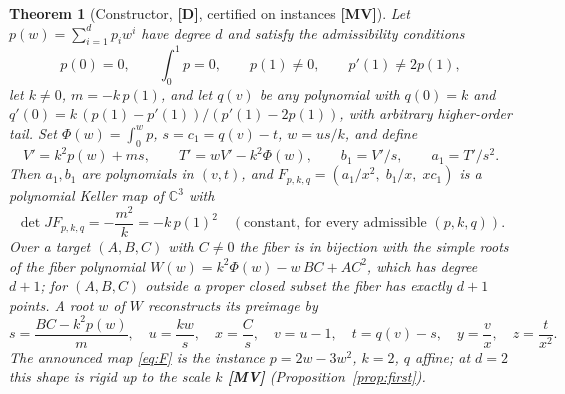 \documentclass[11pt]{article}
\newtheorem{theorem}{Theorem}[section]
\theoremstyle{definition}
\theoremstyle{remark}
\newcommand{\C}{\mathbb{C}}
\newcommand{\MV}{\textbf{[MV]}}
\newcommand{\DD}{\textbf{[D]}}
\begin{document}
\begin{theorem}[Constructor, {\DD}, certified on instances {\MV}]\label{thm:family}
Let $p(w) = \sum_{i=1}^{d} p_i w^i$ have degree $d$ and satisfy the admissibility conditions
\begin{equation}\label{eq:adm}
p(0) = 0, \qquad \int_0^1 p = 0, \qquad p(1) \ne 0, \qquad p'(1) \ne 2 p(1),
\end{equation}
let $k \ne 0$, $m = -k\,p(1)$, and let $q(v)$ be any polynomial with $q(0) = k$ and
$q'(0) = k\,(p(1) - p'(1))/(p'(1) - 2p(1))$, with arbitrary higher-order tail. Set
$\Phi(w) = \int_0^w p$, $s = c_1 = q(v) - t$, $w = u s / k$, and define
\begin{equation}\label{eq:potential}
V' = k^2 p(w) + m s, \qquad T' = w V' - k^2 \Phi(w), \qquad
b_1 = V'/s, \qquad a_1 = T'/s^2 .
\end{equation}
Then $a_1, b_1$ are polynomials in $(v, t)$, and
$F_{p, k, q} = (a_1 / x^2,\; b_1 / x,\; x c_1)$ is a polynomial Keller map of $\C^3$ with
\begin{equation}\label{eq:detfamily}
\det J F_{p,k,q} = -\frac{m^2}{k} = -k\,p(1)^2 \quad (\text{constant, for every admissible } (p,k,q)).
\end{equation}
Over a target $(A,B,C)$ with $C \neq 0$ the fiber is in bijection with the simple roots of the fiber polynomial
$W(w) = k^2\Phi(w) - w\,BC + AC^2$, which has degree $d+1$; for $(A,B,C)$ outside a proper closed subset the fiber has exactly $d+1$ points. A root $w$ of $W$ reconstructs its preimage by
\begin{equation}\label{eq:reconstruct}
s = \frac{BC - k^2 p(w)}{m}, \quad u = \frac{k w}{s}, \quad x = \frac{C}{s}, \quad v = u - 1,
\quad t = q(v) - s, \quad y = \frac{v}{x}, \quad z = \frac{t}{x^2}.
\end{equation}
The announced map \eqref{eq:F} is the instance $p = 2w - 3w^2$, $k = 2$, $q$ affine; at $d = 2$ this shape is rigid up to the scale $k$ \MV{} (Proposition~\ref{prop:first}).
\end{theorem}
\end{document}
